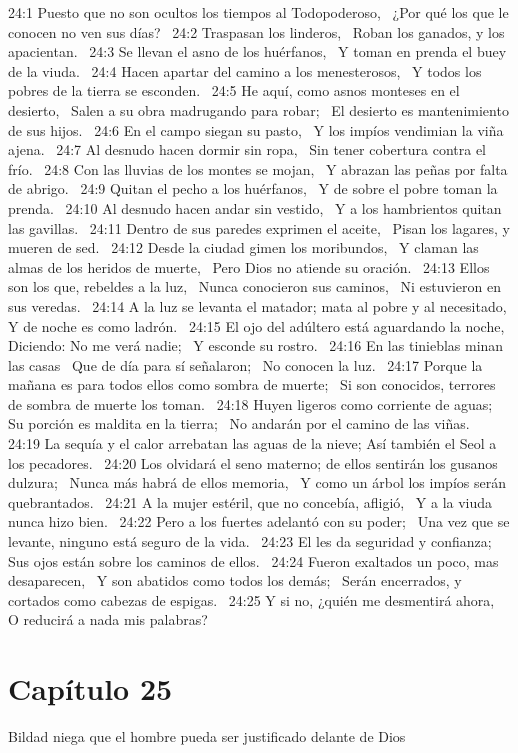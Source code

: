 24:1 Puesto que no son ocultos los tiempos al Todopoderoso,  
¿Por qué los que le conocen no ven sus días?  
24:2 Traspasan los linderos,  
Roban los ganados, y los apacientan.  
24:3 Se llevan el asno de los huérfanos,  
Y toman en prenda el buey de la viuda.  
24:4 Hacen apartar del camino a los menesterosos,  
Y todos los pobres de la tierra se esconden.  
24:5 He aquí, como asnos monteses en el desierto,  
Salen a su obra madrugando para robar;  
El desierto es mantenimiento de sus hijos.  
24:6 En el campo siegan su pasto,  
Y los impíos vendimian la viña ajena.  
24:7 Al desnudo hacen dormir sin ropa,  
Sin tener cobertura contra el frío.  
24:8 Con las lluvias de los montes se mojan,  
Y abrazan las peñas por falta de abrigo.  
24:9 Quitan el pecho a los huérfanos,  
Y de sobre el pobre toman la prenda.  
24:10 Al desnudo hacen andar sin vestido,  
Y a los hambrientos quitan las gavillas.  
24:11 Dentro de sus paredes exprimen el aceite,  
Pisan los lagares, y mueren de sed.  
24:12 Desde la ciudad gimen los moribundos,  
Y claman las almas de los heridos de muerte,  
Pero Dios no atiende su oración.  
24:13 Ellos son los que, rebeldes a la luz,  
Nunca conocieron sus caminos,  
Ni estuvieron en sus veredas.  
24:14 A la luz se levanta el matador; mata al pobre y al necesitado, 
Y de noche es como ladrón.  
24:15 El ojo del adúltero está aguardando la noche,  
Diciendo: No me verá nadie;  
Y esconde su rostro.  
24:16 En las tinieblas minan las casas  
Que de día para sí señalaron;  
No conocen la luz.  
24:17 Porque la mañana es para todos ellos como sombra de muerte;  
Si son conocidos, terrores de sombra de muerte los toman.  
24:18 Huyen ligeros como corriente de aguas;  
Su porción es maldita en la tierra;  
No andarán por el camino de las viñas.  
24:19 La sequía y el calor arrebatan las aguas de la nieve; 
Así también el Seol a los pecadores.  
24:20 Los olvidará el seno materno; de ellos sentirán los gusanos dulzura;  
Nunca más habrá de ellos memoria,  
Y como un árbol los impíos serán quebrantados.  
24:21 A la mujer estéril, que no concebía, afligió,  
Y a la viuda nunca hizo bien.  
24:22 Pero a los fuertes adelantó con su poder;  
Una vez que se levante, ninguno está seguro de la vida.  
24:23 El les da seguridad y confianza;  
Sus ojos están sobre los caminos de ellos.  
24:24 Fueron exaltados un poco, mas desaparecen,  
Y son abatidos como todos los demás;  
Serán encerrados, y cortados como cabezas de espigas.  
24:25 Y si no, ¿quién me desmentirá ahora,  
O reducirá a nada mis palabras?  
\section*{Capítulo 25}
Bildad niega que el hombre pueda ser justificado delante de Dios  


